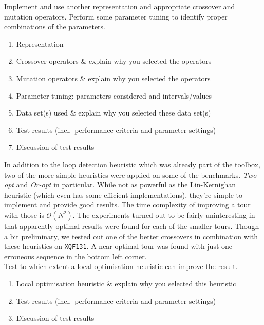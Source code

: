 Implement and use another representation and appropriate crossover and mutation operators. Perform some parameter tuning to identify proper combinations of the parameters. 
\begin{enumerate}
\item	 Representation
\item Crossover operators \& explain why you selected the operators
\item Mutation operators \& explain why you selected the operators
\item Parameter tuning: parameters considered and intervals/values
\item Data set(s) used  \& explain why you selected these data set(s)
\item Test results (incl.\ performance criteria and parameter settings)
\item Discussion of test results

\end{enumerate}


In addition to the loop detection heuristic which was already part of the toolbox, two of the more simple heuristics were applied on some of the benchmarks. \textit{Two-opt} and \textit{Or-opt} in particular. While not as powerful as the Lin-Kernighan heuristic (which even has some efficient implementations), they're simple to implement and provide good results. The time complexity of improving a tour with those is $\mathcal{O}(N^2)$. The experiments turned out to be fairly uninteresting in that apparently optimal results were found for each of the smaller tours. Though a bit preliminary, we tested out one of the better crossovers in combination with these heuristics on \texttt{XQF131}. A near-optimal tour was found with just one erroneous sequence in the bottom left corner.\\

Test to which extent a local optimisation heuristic can improve the result.
\begin{enumerate}
\item	Local optimisation heuristic \& explain why you selected this heuristic
\item Test results (incl.\ performance criteria and parameter settings)
\item Discussion of test results

\end{enumerate}


